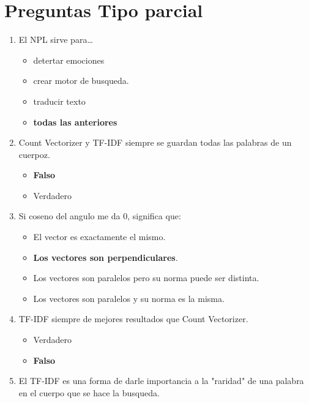 \documentclass[../main.tex]{subfiles}
\begin{document}
\section{Preguntas Tipo parcial}
    \begin{enumerate}
        \item El NPL sirve para\dots
            \begin{itemize}
                \item detertar emociones
                \item crear motor de busqueda.
                \item traducir texto
                \item \textbf{todas las anteriores} \checkmark
            \end{itemize}
        \item Count Vectorizer y TF-IDF siempre se guardan todas las palabras de un cuerpoz.
            \begin{itemize}
                \item \textbf{Falso} \checkmark
                \item Verdadero
            \end{itemize}
        \item Si coseno del angulo me da 0, significa que:
            \begin{itemize}
                \item El vector es exactamente el mismo.  
                \item \textbf{Los vectores son perpendiculares}. \checkmark
                \item Los vectores son paralelos pero su norma puede ser distinta.
                \item Los vectores son paralelos y su norma es la misma.
            \end{itemize}
        \item TF-IDF siempre de mejores resultados que Count Vectorizer.
            \begin{itemize}
                \item Verdadero
                \item \textbf{Falso} \checkmark
            \end{itemize}
        \item El TF-IDF es una forma de darle importancia a la "raridad" de una palabra en el cuerpo que se hace la busqueda.
            \begin{itemize}

\end{itemize}
\end{enumerate}
\end{document}
